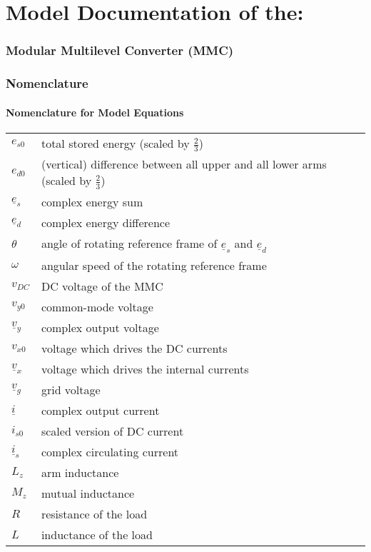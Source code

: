 \documentclass[10pt,a4paper]{article}
\begin{document}
	\part*{Model Documentation of the:}
	\section*{Modular Multilevel Converter (MMC)}


	\section{Nomenclature}
	\subsection{Nomenclature for Model Equations}
	
	\begin{tabular}{ll}
		$e_{s0}$ & total	stored energy (scaled by $\frac{2}{3}$)\\
		$e_{d0}$ & (vertical)	difference between all upper and all lower arms (scaled by $\frac{2}{3}$)\\
		$\underline{e}_s$ & complex energy sum\\
		$\underline{e}_d$ & complex energy difference\\
		$\theta$ & angle of rotating reference frame of $\underline{e}_s$ and $\underline{e}_d$\\
		$\omega$ & angular speed of the rotating reference frame \\
		$v_{DC}$ & DC voltage of the MMC\\
		$v_{y0}$ & common-mode voltage\\
		$\underline{v}_y$ & complex output voltage\\
		$v_{x0}$ & voltage which drives the DC currents \\
		$\underline{v}_x$ & voltage which drives the internal currents \\		
		$\underline{v}_g$ & grid voltage \\
		$\underline{i}$ & complex output current\\
		$i_{s0}$ & scaled version of DC current \\
		$\underline{i}_s$ & complex circulating current\\
		$L_z$ & arm inductance \\
		$M_z$ & mutual inductance \\
		$R$ & resistance of the load \\
		$L$ & inductance of the load		
	\end{tabular}
\end{document}
